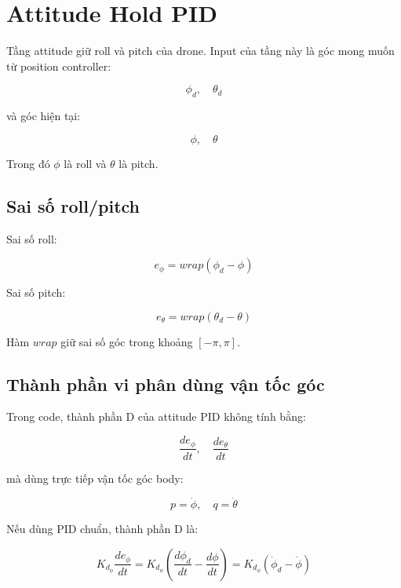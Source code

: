\section{Attitude Hold PID}

Tầng attitude giữ roll và pitch của drone. Input của tầng này là góc mong muốn
từ position controller:

\begin{equation}
    \phi_d,\quad \theta_d
\end{equation}

và góc hiện tại:

\begin{equation}
    \phi,\quad \theta
\end{equation}

Trong đó $\phi$ là roll và $\theta$ là pitch.

\subsection{Sai số roll/pitch}

Sai số roll:

\begin{equation}
    e_\phi = wrap(\phi_d - \phi)
\end{equation}

Sai số pitch:

\begin{equation}
    e_\theta = wrap(\theta_d - \theta)
\end{equation}

Hàm $wrap$ giữ sai số góc trong khoảng $[-\pi,\pi]$.

\subsection{Thành phần vi phân dùng vận tốc góc}

Trong code, thành phần D của attitude PID không tính bằng:

\begin{equation}
    \frac{d e_\phi}{dt},\quad \frac{d e_\theta}{dt}
\end{equation}

mà dùng trực tiếp vận tốc góc body:

\begin{equation}
    p = \dot{\phi},\quad q = \dot{\theta}
\end{equation}

Nếu dùng PID chuẩn, thành phần D là:

\begin{equation}
    K_{d_\phi}\frac{d e_\phi}{dt}
    =
    K_{d_\phi}\left(\frac{d \phi_d}{dt} - \frac{d \phi}{dt}\right)
    =
    K_{d_\phi}(\dot{\phi}_d - \dot{\phi})
\end{equation}

